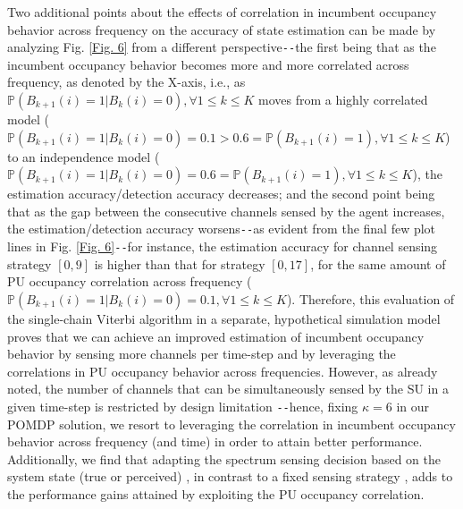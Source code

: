 \documentclass[12pt, draftcls, onecolumn]{IEEEtran}
\begin{document}
Two additional points about the effects of correlation in incumbent occupancy behavior across frequency on the accuracy of state estimation can be made by analyzing Fig. \ref{Fig. 6} from a different perspective\texttt{-{}-}the first being that as the incumbent occupancy behavior becomes more and more correlated across frequency, as denoted by the X-axis, i.e., as $\mathbb{P}(B_{k+1}(i){=}1|B_{k}(i){=}0),{\forall}1{\leq}k{\leq}K$ moves from a highly correlated model ($\mathbb{P}(B_{k+1}(i){=}1|B_{k}(i){=}0){=}0.1{>}0.6{=}\mathbb{P}(B_{k+1}(i){=}1),{\forall}1{\leq}k{\leq}K$) to an independence model ($\mathbb{P}(B_{k+1}(i){=}1|B_{k}(i){=}0){=}0.6{=}\mathbb{P}(B_{k+1}(i){=}1),{\forall}1{\leq}k{\leq}K$), the estimation accuracy/detection accuracy decreases; and the second point being that as the gap between the consecutive channels sensed by the agent increases, the estimation/detection accuracy worsens\texttt{-{}-}as evident from the final few plot lines in Fig. \ref{Fig. 6}\texttt{-{}-}for instance, the estimation accuracy for channel sensing strategy $[0,9]$ is higher than that for strategy $[0,17]$, for the same amount of PU occupancy correlation across frequency ($\mathbb{P}(B_{k+1}(i){=}1|B_{k}(i){=}0){=}0.1,{\forall}1{\leq}k{\leq}K$). Therefore, this evaluation of the single-chain Viterbi algorithm in a separate, hypothetical simulation model proves that we can achieve  an improved estimation of incumbent occupancy behavior by sensing more channels per time-step and by leveraging the correlations in PU occupancy behavior across frequencies. However, as already noted, the number of channels that can be simultaneously sensed by the SU in a given time-step is restricted by design limitation \cite{WCL:3}\texttt{-{}-}hence, fixing $\kappa{=}6$ in our POMDP solution, we resort to leveraging the correlation in incumbent occupancy behavior across frequency (and time) in order to attain better performance. Additionally, we find that adapting the spectrum sensing decision based on the system state (true or perceived) \cite{WCL:paper, WCL:5}, in contrast to a fixed sensing strategy \cite{WCL:6, WCL:7}, adds to the performance gains attained by exploiting the PU occupancy correlation.
\end{document}
